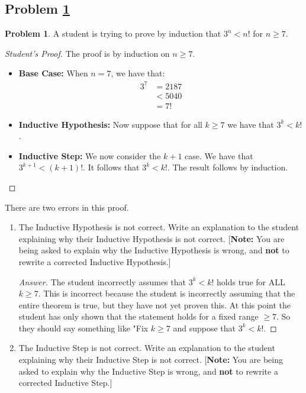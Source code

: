 \documentclass[11pt]{article}
\theoremstyle{definition}
\theoremstyle{definition}
\newtheorem{required}{Problem}
\theoremstyle{definition}
\begin{document}
\subsection{Problem \ref{Induction1}}
\begin{required} \label{Induction1}
A student is trying to prove by induction that $3^{n} < n!$ for $n \geq 7$. 

\begin{proof}[Student's Proof]
The proof is by induction on $n \geq 7$. 
\begin{itemize}
\item \textbf{Base Case:} When $n = 7$, we have that:
\begin{align*}
3^{7} &= 2187 \\
&< 5040 \\
&= 7!
\end{align*}

\item \textbf{Inductive Hypothesis:} Now suppose that for all $k \geq 7$ we have that $3^{k} < k!$. 

\item \textbf{Inductive Step:} We now consider the $k+1$ case. We have that $3^{k+1} < (k+1)!$. It follows that $3^{k} < k!$. The result follows by induction.
\end{itemize}
\end{proof}

There are two errors in this proof. 
\begin{enumerate}[label=(\alph*)]
\item The Inductive Hypothesis is not correct. Write an explanation to the student explaining why their Inductive Hypothesis is not correct.  [\textbf{Note:} You are being asked to explain why the Inductive Hypothesis is wrong, and \textbf{not} to rewrite a corrected Inductive Hypothesis.]


\begin{proof}[Answer]
The student incorrectly assumes that $3^k < k!$ holds true for ALL $k \geq 7$. This is incorrect because the student is incorrectly assuming that the entire theorem is true, but they have not yet proven this. At this point the student has only shown that the statement holds for a fixed range $ \geq 7$. So they should say something like "Fix $k \geq 7$ and suppose that  $3^{k} < k!$.
\end{proof}



\vskip 15pt
\item The Inductive Step is not correct. Write an explanation to the student explaining why their Inductive Step is not correct. [\textbf{Note:} You are being asked to explain why the Inductive Step is wrong, and \textbf{not} to rewrite a corrected Inductive Step.]


\end{enumerate}
\end{required}
\end{document}
